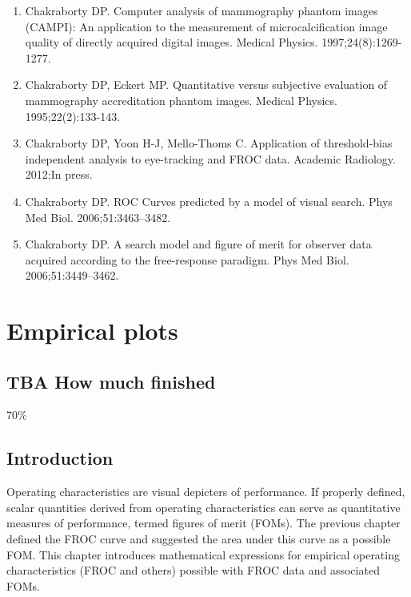 \documentclass[
]{book}
\providecommand{\tightlist}{%
  \setlength{\itemsep}{0pt}\setlength{\parskip}{0pt}}
\begin{document}
\begin{enumerate}
\def\labelenumi{\arabic{enumi}.}
\tightlist
\item
  Chakraborty DP. Computer analysis of mammography phantom images (CAMPI): An application to the measurement of microcalcification image quality of directly acquired digital images. Medical Physics. 1997;24(8):1269-1277.
\item
  Chakraborty DP, Eckert MP. Quantitative versus subjective evaluation of mammography accreditation phantom images. Medical Physics. 1995;22(2):133-143.
\item
  Chakraborty DP, Yoon H-J, Mello-Thoms C. Application of threshold-bias independent analysis to eye-tracking and FROC data. Academic Radiology. 2012;In press.
\item
  Chakraborty DP. ROC Curves predicted by a model of visual search. Phys Med Biol. 2006;51:3463--3482.
\item
  Chakraborty DP. A search model and figure of merit for observer data acquired according to the free-response paradigm. Phys Med Biol. 2006;51:3449--3462.
\end{enumerate}

\hypertarget{froc-empirical}{%
\chapter{Empirical plots}\label{froc-empirical}}

\hypertarget{froc-empirical-how-much-finished}{%
\section{TBA How much finished}\label{froc-empirical-how-much-finished}}

70\%

\hypertarget{froc-empirical-intro}{%
\section{Introduction}\label{froc-empirical-intro}}

Operating characteristics are visual depicters of performance. If properly defined, scalar quantities derived from operating characteristics can serve as quantitative measures of performance, termed figures of merit (FOMs). The previous chapter defined the FROC curve and suggested the area under this curve as a possible FOM. This chapter introduces mathematical expressions for empirical operating characteristics (FROC and others) possible with FROC data and associated FOMs.
\end{document}
